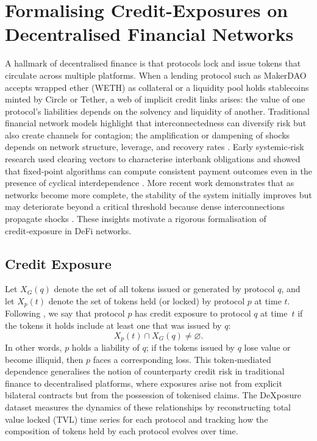 \documentclass[preprint,12pt]{elsarticle}
\begin{document}
%
 \section{Formalising Credit-Exposures on Decentralised Financial Networks}

A hallmark of decentralised finance is that protocols lock and issue tokens that circulate across multiple platforms.  When a lending protocol such as MakerDAO accepts wrapped ether (WETH) as collateral or a liquidity pool holds stablecoins minted by Circle or Tether, a web of implicit credit links arises: the value of one protocol’s liabilities depends on the solvency and liquidity of another.  Traditional financial network models highlight that interconnectedness can diversify risk but also create channels for contagion; the amplification or dampening of shocks depends on network structure, leverage, and recovery rates \cite{Glasserman2016}.  Early systemic‑risk research used clearing vectors to characterise interbank obligations and showed that fixed‑point algorithms can compute consistent payment outcomes even in the presence of cyclical interdependence \cite{EisenbergNoe2001}.  More recent work demonstrates that as networks become more complete, the stability of the system initially improves but may deteriorate beyond a critical threshold because dense interconnections propagate shocks \cite{Acemoglu2013}.  These insights motivate a rigorous formalisation of credit‑exposure in DeFi networks.

\subsection{Credit Exposure}

Let $X_G(q)$ denote the set of all tokens issued or generated by protocol $q$, and let $X_p(t)$ denote the set of tokens held (or locked) by protocol $p$ at time $t$.  Following \cite{wu2025}, we say that protocol $p$ has {credit exposure} to protocol $q$ at time~$t$ if the tokens it holds include at least one that was issued by $q$:
\begin{equation}
X_p(t)\cap X_G(q)\neq \varnothing.
\label{eq:credit-exposure-definition}
\end{equation}
In other words, $p$ holds a liability of $q$; if the tokens issued by $q$ lose value or become illiquid, then $p$ faces a corresponding loss.  This token‑mediated dependence generalises the notion of counterparty credit risk in traditional finance to decentralised platforms, where exposures arise not from explicit bilateral contracts but from the possession of tokenised claims.  The DeXposure dataset measures the dynamics of these relationships by reconstructing total value locked (TVL) time series for each protocol and tracking how the composition of tokens held by each protocol evolves over time.
\end{document}
